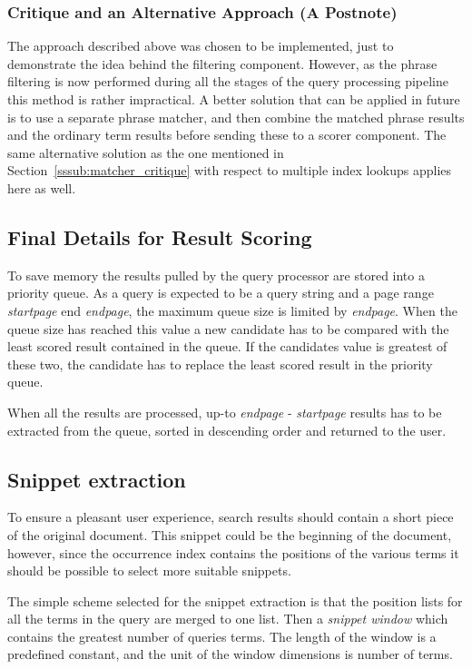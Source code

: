 \subsubsection{Critique and an Alternative Approach (A Postnote)}
The approach described above was chosen to be implemented, just to demonstrate the idea behind the filtering component. However, as the phrase filtering is now performed during all the stages of the query processing pipeline this method is rather impractical. A better solution that can be applied in future is to use a separate phrase matcher, and then combine the matched phrase results and the ordinary term results before sending these to a scorer component. The same alternative solution as the one mentioned in Section~\ref{sssub:matcher_critique} with respect to multiple index lookups applies here as well.

\subsection{Final Details for Result Scoring}
To save memory the results pulled by the query processor are stored into a priority queue. As a query is expected to be a query string and a page range {\it startpage} end {\it endpage}, the maximum queue size is limited by {\it endpage}. When the queue size has reached this value a new candidate has to be compared with the least scored result contained in the queue. If the candidates value is greatest of these two, the candidate has to replace the least scored result in the priority queue.

When all the results are processed, up-to {\it endpage} - {\it startpage} results has to be extracted from the queue, sorted in descending order and returned to the user.

\subsection{Snippet extraction}\label{sub:snippet_extraction}
To ensure a pleasant user experience, search results should contain a short piece of the original document. This snippet could be the beginning of the document, however, since the occurrence index contains the positions of the various terms it should be possible to select more suitable snippets. 

The simple scheme selected for the snippet extraction is that the position lists for all the terms in the query are merged to one list. Then a {\it snippet window} which contains the greatest number of queries terms. The length of the window is a predefined constant, and the unit of the window dimensions is number of terms.

